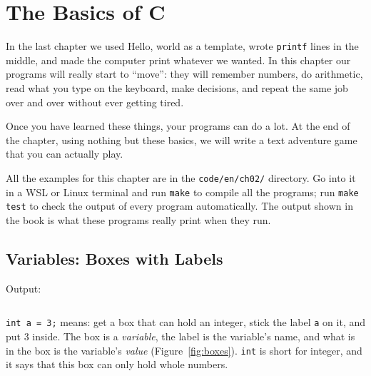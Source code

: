 \chapter{The Basics of C}
\label{chap:c-basics}

In the last chapter we used Hello, world as a template, wrote \texttt{printf} lines in the middle, and made the computer print whatever we wanted. In this chapter our programs will really start to ``move'': they will remember numbers, do arithmetic, read what you type on the keyboard, make decisions, and repeat the same job over and over without ever getting tired.

Once you have learned these things, your programs can do a lot. At the end of the chapter, using nothing but these basics, we will write a text adventure game that you can actually play.

All the examples for this chapter are in the \texttt{code/en/ch02/} directory. Go into it in a WSL or Linux terminal and run \texttt{make} to compile all the programs; run \texttt{make test} to check the output of every program automatically. The output shown in the book is what these programs really print when they run.

\section{Variables: Boxes with Labels}
\label{sec:variable}


Output:
\inputminted[linenos=false]{text}{code/en/ch02/out/var.txt}

\texttt{int a = 3;} means: get a box that can hold an integer, stick the label \texttt{a} on it, and put 3 inside. The box is a \emph{variable}, the label is the variable's name, and what is in the box is the variable's \emph{value} (Figure~\ref{fig:boxes}). \texttt{int} is short for integer, and it says that this box can only hold whole numbers.

